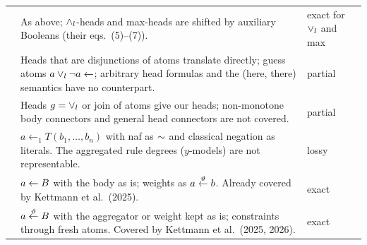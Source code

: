 {\begin{longtable}{@{}p{}p{}p{}@{}}
            \cite{AlvianoP15}                                                                               & As above; $\land_l$-heads and max-heads are shifted by auxiliary Booleans (their eqs.~(5)--(7)).                                                                                                                                                                  & exact for $\lor_l$ and max           \\
            \cite{SchockaertJVD09,SchockaertJV12}                                                           & Heads that are disjunctions of atoms translate directly; guess atoms $a\lor_l\neg a\leftarrow$; arbitrary head formulas and the (here, there) semantics have no counterpart.                                                                                      & partial                                \\
            \cite{StracciaOD09}                                                                             & Heads $g=\lor_l$ or join of atoms give our heads; non-monotone body connectors and general head connectors are not covered.                                                                                                                                       & partial                                \\
            \cite{VanNieuwenborghDV06,VanNieuwenborghDV07}                                                  & $a\leftarrow_1 T(b_1,\dots,b_n)$ with naf as $\mathord{\sim}$ and classical negation as literals. The aggregated rule degrees ($y$-models) are not representable.                                                                                                          & lossy                                  \\
            \cite{JanssenSVD09,JanssenVSD12,JanssenSVD12core,AlvianoP13,AlvianoAP17,LoyerS09}               & $a\overset{}{\gets}B$ with the body as is; weights as $a\overset{\vartheta}{\gets}b$. Already covered by Kettmann et al.~(2025).                                                                                                                                                     & exact                                  \\
            \cite{NicolasGSL06,MadridO12,CornejoLM18,CornejoLM20,CornejoLM20math,MedinaOV01,LukasiewiczS09} & $a\overset{\vartheta}{\gets}B$ with the aggregator or weight kept as is; constraints through fresh atoms. Covered by Kettmann et al.~(2025, 2026).                                                                                                                          & exact                                  \\

\end{longtable}}
